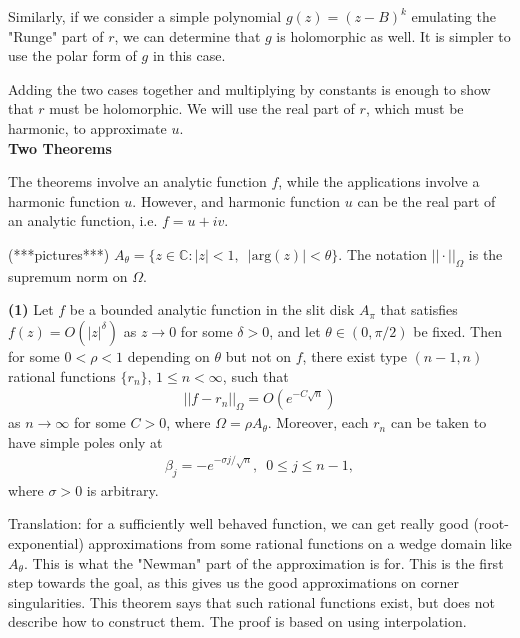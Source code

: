\documentclass[12]{article}
\begin{document}
	Similarly, if we consider a simple polynomial $g(z)=(z-B)^k$ emulating the "Runge" part of $r$, we can determine that $g$ is holomorphic as well. It is simpler to use the polar form of $g$ in this case.
	
	Adding the two cases together and multiplying by constants is enough to show that $r$ must be holomorphic. We will use the real part of $r$, which must be harmonic, to approximate $u$.\\

\noindent
\textbf{Two Theorems}

	The theorems involve an analytic function $f$, while the applications involve a harmonic function $u$. However, and harmonic function $u$ can be the real part of an analytic function, i.e. $f=u+i v$.
	
	(***pictures***) $A_\theta=\{z \in \mathds{C} : |z|<1,\enspace |\mathrm{arg}(z)|<\theta \}$. The notation $||\cdot ||_\Omega$ is the supremum norm on $\Omega$.
	
	\textbf{(1)} Let $f$ be a bounded analytic function in the slit disk $A_\pi$ that satisfies $f(z)=O(|z|^\delta)$ as $z \to 0$ for some $\delta > 0$, and let $\theta \in (0,\pi /2)$ be fixed. Then for some $0< \rho < 1$ depending on $\theta$ but not on $f$, there exist type $(n-1,n)$ rational functions $\{r_n\}$, $1 \leq n < \infty$, such that
	\begin{align*}
	||f-r_n||_\Omega = O(e^{-C \sqrt{n}})
	\end{align*}
as $n \to \infty $ for some $C>0$, where $\Omega = \rho A_\theta$. Moreover, each $r_n$ can be taken to have simple poles only at
	\begin{align*}
	\beta_j = -e^{-\sigma j/\sqrt{n}}, \enspace 0\leq j \leq n-1,
	\end{align*}
where $\sigma >0$ is arbitrary.

	Translation: for a sufficiently well behaved function, we can get really good (root-exponential) approximations from some rational functions on a wedge domain like $A_\theta$. This is what the "Newman" part of the approximation is for. This is the first step towards the goal, as this gives us the good approximations on corner singularities. This theorem says that such rational functions exist, but does not describe how to construct them. The proof is based on using interpolation. 
	
\end{document}
